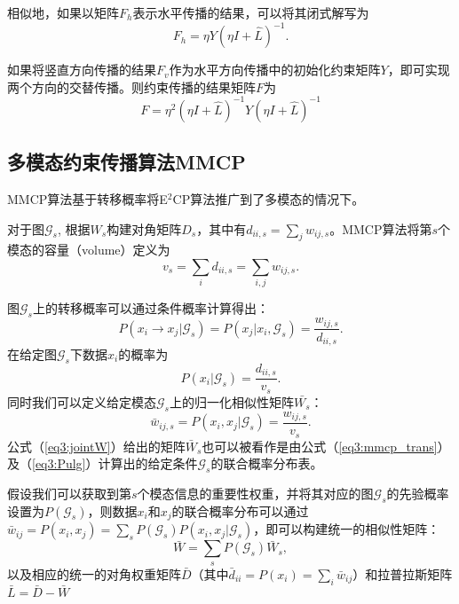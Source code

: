 相似地，如果以矩阵$F_h$表示水平传播的结果，可以将其闭式解写为
\begin{equation}
{F}_h = \eta{Y}(\eta{I}+\hat{{L}})^{-1}.
\end{equation}

如果将竖直方向传播的结果$F_v$作为水平方向传播中的初始化约束矩阵$Y$，即可实现两个方向的交替传播。则约束传播的结果矩阵$F$为
\begin{equation}
{F} = \eta^2(\eta{I}+\hat{{L}})^{-1}{Y}(\eta{I}+\hat{{L}})^{-1}
\label{eq3:e2cp}
\end{equation}

\subsection{多模态约束传播算法MMCP}
MMCP算法基于转移概率将E$^2$CP算法推广到了多模态的情况下。

对于图$\mathcal{G}_s$, 根据${W}_s$构建对角矩阵${D}_s$，其中有$d_{ii,s} = \sum_j w_{ij,s}$。MMCP算法将第$s$个模态的容量（volume）定义为
\begin{equation}
v_s = \sum_i d_{ii,s} = \sum_{i,j}w_{ij,s}.
\end{equation}

图$\mathcal{G}_s$上的转移概率可以通过条件概率计算得出：
\begin{equation}
	P(x_i\rightarrow x_j|\mathcal{G}_s) = P(x_j|x_i,\mathcal{G}_s) = \frac{w_{ij,s}}{d_{ii,s}}.
	\label{eq3:mmcp_trans}
\end{equation}
在给定图$\mathcal{G}_s$下数据$x_i$的概率为
\begin{equation}
P(x_i|\mathcal{G}_s) = \frac{d_{ii,s}}{v_s}.
\label{eq3:Pulg}
\end{equation}
同时我们可以定义给定模态$\mathcal{G}_s$上的归一化相似性矩阵$\bar{W_s}$：
\begin{equation}
    \bar{w}_{ij,s} = P(x_i, x_j|\mathcal{G}_s) = \frac{{w}_{ij,s}}{v_s}.
    \label{eq3:jointW}
\end{equation}
公式（\ref{eq3:jointW}）给出的矩阵$\bar{W}_s$也可以被看作是由公式（\ref{eq3:mmcp_trans}）及（\ref{eq3:Pulg}）计算出的给定条件$\mathcal{G}_s$的联合概率分布表。

假设我们可以获取到第$s$个模态信息的重要性权重，并将其对应的图$\mathcal{G}_s$的先验概率设置为$ P(\mathcal{G}_s) $，则数据$x_i$和$x_j$的联合概率分布可以通过$ \bar{w}_{ij}= P(x_i, x_j) = \sum_s P(\mathcal{G}_s) P(x_i, x_j|\mathcal{G}_s) $，即可以构建统一的相似性矩阵：
\begin{equation}
\bar{{W}} = \sum_s P(\mathcal{G}_s)\bar{{W}}_s, 
\label{eq3:unifiedW}
\end{equation}
以及相应的统一的对角权重矩阵$ \bar{{D}}$（其中$ \bar{d}_{ii} = P(x_i) =\sum_i \bar{w}_{ij}$）和拉普拉斯矩阵$ \bar{{L}} = \bar{{D}}-\bar{{W}}$

